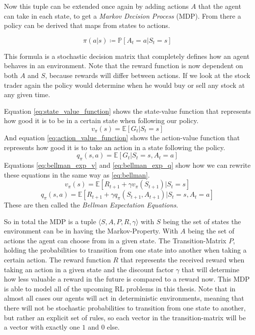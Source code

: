 Now this tuple can be extended once again by adding actions $A$ that the agent can take in each state, to get a \emph{Markov Decision Process} (MDP).
From there a policy can be derived that maps from states to actions.
\begin{defn}[Policy]
\begin{equation} \label{eq:policy}
	\pi (a|s) \coloneqq \mathbb{P}[A_{t} = a | S_{t} = s]
\end{equation}
\end{defn}
This formula is a stochastic decision matrix that completely defines how an agent behaves in an environment.
Note that the reward function is now dependent on both $A$ and $S$, because rewards will differ between actions.
If we look at the stock trader again the policy would determine when he would buy or sell any stock at any given time.


Equation \ref{eq:state_value_function} shows the state-value function that represents how good it is to be in a certain state when following our policy.
\begin{equation} \label{eq:state_value_function}
	v_{\pi}(s) = \mathbb{E}[G_{t} | S_{t} = s]
\end{equation}
And equation \ref{eq:action_value_function} shows the action-value function that represents how good it is to take an action in a state following the policy.
\begin{equation} \label{eq:action_value_function}
	q_{\pi}(s,a) = \mathbb{E}[G_{t} | S_{t} = s, A_{t} = a]
\end{equation}
Equations \ref{eq:bellman_exp_v} and \ref{eq:bellman_exp_q} show how we can rewrite these equations in the same way as \ref{eq:bellman}.
\begin{equation} \label{eq:bellman_exp_v}
	v_{\pi}(s) = \mathbb{E}[R_{t+1} + \gamma v_{\pi}(S_{t+1}) | S_{t} = s]
\end{equation}
\begin{equation} \label{eq:bellman_exp_q}
	q_{\pi}(s,a) = \mathbb{E}[R_{t+1} + \gamma q_{\pi}(S_{t+1}, A_{t+1}) | S_{t} = s, A_{t} = a]
\end{equation}
These are then called the \emph{Bellman Expectation Equations}.


So in total the MDP is a tuple $\langle S,A,P,R,\gamma \rangle$ with $S$ being the set of states the environment can be in having the Markov-Property.
With $A$ being the set of actions the agent can choose from in a given state.
The Transition-Matrix $P$, holding the probabilities to transition from one state into another when taking a certain action.
The reward function $R$ that represents the received reward when taking an action in a given state and the discount factor $\gamma$ that will determine how less valuable a reward in the future is compared to a reward now.
This MDP is able to model all of the upcoming RL problems in this thesis.
Note that in almost all cases our agents will act in deterministic environments, meaning that there will not be stochastic probabilities to transition from one state to another, but rather an explicit set of rules, so each vector in the transition-matrix will be a vector with exactly one $1$ and $0$ else.


